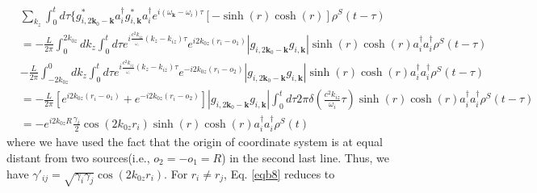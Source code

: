 \documentclass{article}
\let\vec\bm
\begin{document}
\begin{equation}
\label{eqb9}
\begin{split}
&\underset{k_{z}}{\sum}\int_{0}^{t}d\tau\{g_{i,2\vec{k}_{0}-\vec{k}}^{*}a_{i}^{\dagger}g_{i,\vec{k}}^{*}a_{i}^{\dagger}e^{i(\omega_{\vec{k}}-\omega_{i})\tau}[-\sinh(r)\cosh(r)]\rho^{S}(t-\tau)\\
&=-\frac{L}{2\pi}\int_{0}^{2k_{0z}}dk_{z}\int_{0}^{t}d\tau e^{i\frac{c^{2}k_{iz}}{_{\omega_{i}}}(k_{z}-k_{iz})\tau}e^{i2k_{0z}(r_{i}-o_{1})}|g_{i,2\vec{k}_{0}-\vec{k}}g_{i,\vec{k}}|\sinh(r)\cosh(r)a_{i}^{\dagger}a_{i}^{\dagger}\rho^{S}(t-\tau)\\
&-\frac{L}{2\pi}\int_{-2k_{0z}}^{0}dk_{z}\int_{0}^{t}d\tau e^{i\frac{c^{2}k_{iz}}{_{\omega_{i}}}(k_{z}-k_{iz})\tau}e^{-i2k_{0z}(r_{i}-o_{2})}|g_{i,2\vec{k}_{0}-\vec{k}}g_{i,\vec{k}}|\sinh(r)\cosh(r)a_{i}^{\dagger}a_{i}^{\dagger}\rho^{S}(t-\tau)\\
&=-\frac{L}{2\pi}[e^{i2k_{0z}(r_{i}-o_{1})}+e^{-i2k_{0z}(r_{i}-o_{2})}]|g_{i,2\vec{k}_{0}-\vec{k}}g_{i,\vec{k}}|\int_{0}^{t}d\tau2\pi\delta(\frac{c^{2}k_{iz}}{\omega_{i}}\tau)\sinh(r)\cosh(r)a_{i}^{\dagger}a_{i}^{\dagger}\rho^{S}(t-\tau)\\
& =-e^{i2k_{0z}R}\frac{\gamma_{i}}{2}\cos(2k_{0z}r_{i})\sinh(r)\cosh(r)a_{i}^{\dagger}a_{i}^{\dagger}\rho^{S}(t)
\end{split}
\end{equation}
where we have used the fact that the origin of coordinate system is at equal distant from two sources(i.e., $o_2=-o_1=R$) in the second last line. Thus, we have $\gamma'_{ij}=\sqrt{\gamma_{i}\gamma_{j}}\cos(2k_{0z}r_{i})$. For $r_i\neq r_j$, Eq. \eqref{eqb8} reduces to
\end{document}
